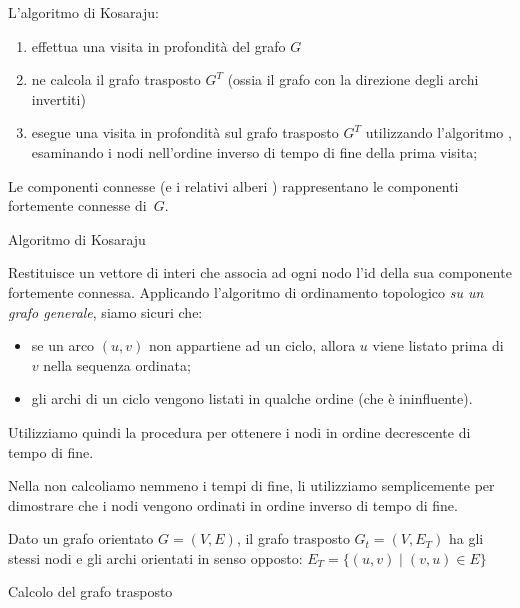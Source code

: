 L'algoritmo di Kosaraju:
\begin{enumerate}
	\item effettua una visita in profondità del grafo \(G\)
	\item ne calcola il grafo trasposto \(G^T\) (ossia il grafo con la direzione degli archi invertiti)
	\item esegue una visita in profondità sul grafo trasposto \(G^T\) utilizzando l'algoritmo \ConnectedComponents, esaminando i nodi nell'ordine inverso di tempo di fine della prima visita;
\end{enumerate}
Le componenti connesse (e i relativi alberi ) rappresentano le componenti fortemente connesse \mbox{di \(G\)}.

\begin{algorithm}[H]
	\caption{Algoritmo di Kosaraju}
	
\end{algorithm}

Restituisce un vettore di interi che associa ad ogni nodo l'id della sua componente fortemente connessa.
Applicando l'algoritmo di ordinamento topologico \emph{su un grafo generale}, siamo sicuri che:
\begin{itemize}
	\item se un arco \((u,v)\) non appartiene ad un ciclo, allora \(u\) viene listato prima di \(v\) nella sequenza ordinata;
	\item gli archi di un ciclo vengono listati in qualche ordine (che è ininfluente).
\end{itemize}
Utilizziamo quindi la procedura \topSort per ottenere i nodi in ordine decrescente di tempo di fine.

Nella \topSort non calcoliamo nemmeno i tempi di fine, li utilizziamo semplicemente per dimostrare che i nodi vengono ordinati in ordine inverso di tempo di fine.


\begin{definition}
Dato un grafo orientato \(G = (V, E)\), il grafo trasposto \mbox{\(G_t = (V,E_T)\)} ha gli stessi nodi e gli archi orientati in senso opposto: \(E_T = \{ (u,v) \mid (v,u) \in E \}\)
\end{definition}

\begin{algorithm}[H]
	\caption{Calcolo del grafo trasposto}
	
\end{algorithm}

